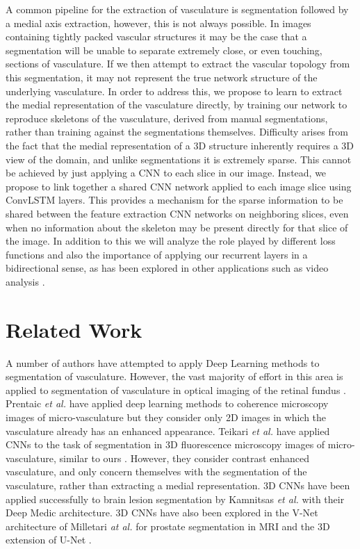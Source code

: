 \documentclass[journal,transmag]{IEEEtran}
\begin{document}
A common pipeline for the extraction of vasculature is segmentation followed by a medial axis extraction, however, this is not always possible. In images containing tightly packed vascular structures it may be the case that a segmentation will be unable to separate extremely close, or even touching, sections of vasculature. If we then attempt to extract the vascular topology from this segmentation, it may not represent the true network structure of the underlying vasculature. In order to address this, we propose to learn to extract the medial representation of the vasculature directly, by training our network to reproduce skeletons of the vasculature, derived from manual segmentations, rather than training against the segmentations themselves. Difficulty arises from the fact that the medial representation of a 3D structure inherently requires a 3D view of the domain, and unlike segmentations it is extremely sparse. This cannot be achieved by just applying a CNN to each slice in our image. Instead, we propose to link together a shared CNN network applied to each image slice using ConvLSTM layers. This provides a mechanism for the sparse information to be shared between the feature extraction CNN networks on neighboring slices, even when no information about the skeleton may be present directly for that slice of the image. In addition to this we will analyze the role played by different loss functions and also the importance of applying our recurrent layers in a bidirectional sense, as has been explored in other applications such as video analysis \cite{GravesHybridLSTM}.

\section{Related Work}


A number of authors have attempted to apply Deep Learning methods to segmentation of vasculature. However, the vast majority of effort in this area is applied to segmentation of vasculature in optical imaging of the retinal fundus  \cite{Liskowski2016,Fang2015,Li2016}. Prentaic \emph{et al. } have applied deep learning methods to coherence microscopy images of micro-vasculature \cite{Liskowski2016} but they consider only 2D images in which the vasculature already has an enhanced appearance. Teikari \emph{et al. } have applied CNNs to the task of segmentation in 3D fluorescence microscopy images of micro-vasculature, similar to ours \cite{Teikari2016}. However, they consider contrast enhanced vasculature, and only concern themselves with the segmentation of the vasculature, rather than extracting a medial representation. 3D CNNs have been applied successfully to brain lesion segmentation by Kamnitsas \emph{et al.}  \cite{Kamnitsas2016} with their Deep Medic architecture. 3D CNNs have also been explored in the V-Net architecture of Milletari \emph{at al.} \cite{Milletari2016} for prostate segmentation in MRI and the 3D extension of U-Net \cite{Cicek2016}.
\end{document}
